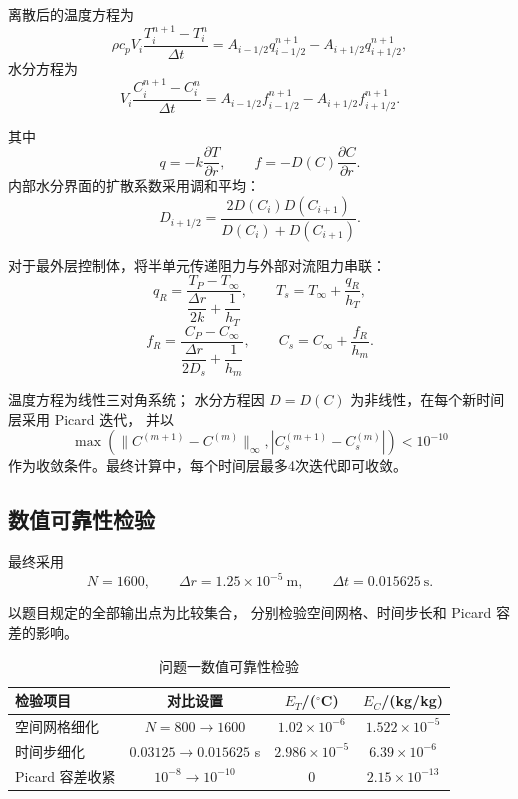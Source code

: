 \documentclass[UTF8,a4paper,12pt]{ctexart}
\begin{document}
离散后的温度方程为
\begin{equation}
\rho c_pV_i
\frac{T_i^{n+1}-T_i^n}{\Delta t}
=
A_{i-1/2}q_{i-1/2}^{n+1}
-
A_{i+1/2}q_{i+1/2}^{n+1},
\end{equation}
水分方程为
\begin{equation}
V_i
\frac{C_i^{n+1}-C_i^n}{\Delta t}
=
A_{i-1/2}f_{i-1/2}^{n+1}
-
A_{i+1/2}f_{i+1/2}^{n+1}.
\end{equation}

其中
\[
q=-k\frac{\partial T}{\partial r},
\qquad
f=-D(C)\frac{\partial C}{\partial r}.
\]
内部水分界面的扩散系数采用调和平均：
\begin{equation}
D_{i+1/2}
=
\frac{2D(C_i)D(C_{i+1})}
{D(C_i)+D(C_{i+1})}.
\end{equation}

对于最外层控制体，将半单元传递阻力与外部对流阻力串联：
\begin{equation}
q_R=
\frac{T_P-T_\infty}
{\dfrac{\Delta r}{2k}+\dfrac1{h_T}},
\qquad
T_s=T_\infty+\frac{q_R}{h_T},
\end{equation}
\begin{equation}
f_R=
\frac{C_P-C_\infty}
{\dfrac{\Delta r}{2D_s}+\dfrac1{h_m}},
\qquad
C_s=C_\infty+\frac{f_R}{h_m}.
\end{equation}

温度方程为线性三对角系统；
水分方程因 $D=D(C)$ 为非线性，在每个新时间层采用 Picard 迭代，
并以
\[
\max\left(
\|C^{(m+1)}-C^{(m)}\|_\infty,
|C_s^{(m+1)}-C_s^{(m)}|
\right)<10^{-10}
\]
作为收敛条件。最终计算中，每个时间层最多4次迭代即可收敛。

\subsection{数值可靠性检验}

最终采用
\[
N=1600,\qquad
\Delta r=1.25\times10^{-5}\ \mathrm m,
\qquad
\Delta t=0.015625\ \mathrm s.
\]

以题目规定的全部输出点为比较集合，
分别检验空间网格、时间步长和 Picard 容差的影响。

\begin{table}[H]
\centering
\caption{问题一数值可靠性检验}
\begin{tabular}{lccc}
\toprule
检验项目 & 对比设置 & $E_T$/($^\circ$C) & $E_C$/(kg/kg)\\
\midrule
空间网格细化
& $N=800\rightarrow1600$
& $1.02\times10^{-6}$
& $1.522\times10^{-5}$\\
时间步细化
& $0.03125\rightarrow0.015625$ s
& $2.986\times10^{-5}$
& $6.39\times10^{-6}$\\
Picard 容差收紧
& $10^{-8}\rightarrow10^{-10}$
& $0$
& $2.15\times10^{-13}$\\
\bottomrule
\end{tabular}
\end{table}
\end{document}
